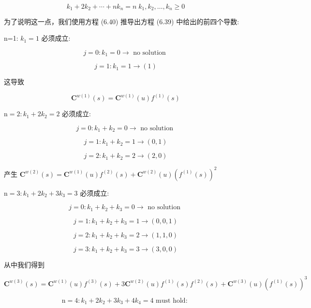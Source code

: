 \documentclass[../main.tex]{subfiles}
\begin{document}
\[
{k}_{1} + 2{k}_{2} + \cdots  + n{k}_{n} = n\;{k}_{1},{k}_{2},\ldots ,{k}_{n} \geq  0
\]

为了说明这一点，我们使用方程 (6.40) 推导出方程 (6.39) 中给出的前四个导数:

n=1: \({k}_{1} = 1\) 必须成立:

\[
j = 0 : {k}_{1} = 0 \rightarrow  \text{ no solution }
\]

\[
j = 1 : {k}_{1} = 1 \rightarrow  \left( 1\right)
\]

这导致

\[
{\mathbf{C}}^{w\left( 1\right) }\left( s\right)  = {\mathbf{C}}^{w\left( 1\right) }\left( u\right) {f}^{\left( 1\right) }\left( s\right)
\]

\(\mathrm{n} = 2 : {k}_{1} + 2{k}_{2} = 2\) 必须成立:

\[
j = 0 : {k}_{1} + {k}_{2} = 0 \rightarrow  \text{ no solution }
\]

\[
j = 1 : {k}_{1} + {k}_{2} = 1 \rightarrow  \left( {0,1}\right)
\]

\[
j = 2 : {k}_{1} + {k}_{2} = 2 \rightarrow  \left( {2,0}\right)
\]

产生 \({\mathbf{C}}^{w\left( 2\right) }\left( s\right)  = {\mathbf{C}}^{w\left( 1\right) }\left( u\right) {f}^{\left( 2\right) }\left( s\right)  + {\mathbf{C}}^{w\left( 2\right) }\left( u\right) {\left( {f}^{\left( 1\right) }\left( s\right) \right) }^{2}\)

\(\mathrm{n} = 3 : {k}_{1} + 2{k}_{2} + 3{k}_{3} = 3\) 必须成立:

\[
j = 0 : {k}_{1} + {k}_{2} + {k}_{3} = 0 \rightarrow  \text{ no solution }
\]

\[
j = 1 : {k}_{1} + {k}_{2} + {k}_{3} = 1 \rightarrow  \left( {0,0,1}\right)
\]

\[
j = 2 : {k}_{1} + {k}_{2} + {k}_{3} = 2 \rightarrow  \left( {1,1,0}\right)
\]

\[
j = 3 : {k}_{1} + {k}_{2} + {k}_{3} = 3 \rightarrow  \left( {3,0,0}\right)
\]

从中我们得到

\[
{\mathbf{C}}^{w\left( 3\right) }\left( s\right)  = {\mathbf{C}}^{w\left( 1\right) }\left( u\right) {f}^{\left( 3\right) }\left( s\right)  + 3{\mathbf{C}}^{w\left( 2\right) }\left( u\right) {f}^{\left( 1\right) }\left( s\right) {f}^{\left( 2\right) }\left( s\right)  + {\mathbf{C}}^{w\left( 3\right) }\left( u\right) {\left( {f}^{\left( 1\right) }\left( s\right) \right) }^{3}
\]

\[
\mathrm{n} = 4 : {k}_{1} + 2{k}_{2} + 3{k}_{3} + 4{k}_{4} = 4\text{ must hold: }
\]
\end{document}
